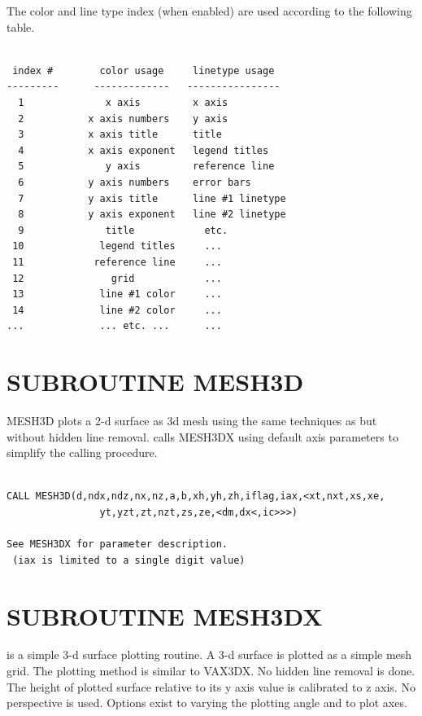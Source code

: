 \documentclass[11pt]{report}
\begin{document}
The color and line type index (when enabled) are used according to the
following table.
\begin{verbatim}

 index #        color usage     linetype usage
---------      -------------   ----------------
  1              x axis         x axis
  2           x axis numbers    y axis
  3           x axis title      title
  4           x axis exponent   legend titles
  5              y axis         reference line
  6           y axis numbers    error bars
  7           y axis title      line #1 linetype
  8           y axis exponent   line #2 linetype
  9              title            etc.
 10             legend titles     ...
 11            reference line     ...
 12               grid            ...
 13             line #1 color     ...
 14             line #2 color     ...
...             ... etc. ...      ...
\end{verbatim}

\newpage
\section{SUBROUTINE MESH3D}

MESH3D plots a 2-d surface as 3d mesh using the same techniques
as  but without hidden line removal.
 calls MESH3DX using default axis parameters to simplify
the calling procedure.
\begin{verbatim}

CALL MESH3D(d,ndx,ndz,nx,nz,a,b,xh,yh,zh,iflag,iax,<xt,nxt,xs,xe,
                yt,yzt,zt,nzt,zs,ze,<dm,dx<,ic>>>)

See MESH3DX for parameter description.
 (iax is limited to a single digit value)
\end{verbatim}
\section{SUBROUTINE MESH3DX}

 is a simple 3-d surface plotting routine.  A 3-d surface is
plotted as a simple mesh grid.  The plotting method is similar to
VAX3DX. No hidden line removal is done.
The height of plotted surface relative to its y axis value
is calibrated to z axis.  No perspective is used.
Options exist to varying the plotting angle and to plot axes.
\end{document}
